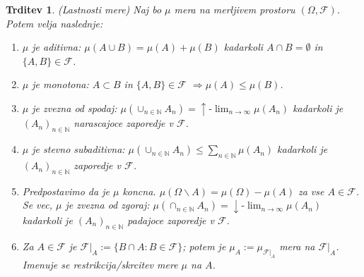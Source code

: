\documentclass[a4paper,12pt]{article}
\theoremstyle{definition} %
\theoremstyle{plain} %
\newtheorem{trditev}[definicija]{Trditev}
\newcommand{\N}{\mathbb{N}}
\newcommand{\F}{\mathcal{F}}
\begin{document}
            \begin{trditev}(Lastnosti mere)
                Naj bo $\mu$ mera na merljivem prostoru $\left( \Omega, \F \right)$. Potem velja naslednje:
                \begin{enumerate}
                    \item $\mu$ je aditivna: $\mu(A \cup B) = \mu(A) + \mu(B)$ kadarkoli $A \cap B = \emptyset$ in $\{A, B\} \in \F$.
                    \item $\mu$ je monotona: $A \subset B$ in $ \{A, B\} \in \F$ $ \Rightarrow \mu(A) \leq \mu(B)$.
                    \item $\mu$ je zvezna od spodaj: $\mu(\cup_{n \in \N}A_n) = \uparrow\text{-}\lim_{n \rightarrow \infty}\mu(A_n)$ kadarkoli je $(A_n)_{n \in \N}$ narascajoce zaporedje v $\F$.
                    \item $\mu$ je stevno subaditivna: $\mu(\cup_{n \in \N}A_n) \leq \sum_{n \in \N}\mu(A_n)$ kadarkoli je $(A_n)_{n \in \N}$ zaporedje v $\F$.
                    \item Predpostavimo da je $\mu$ koncna. $\mu(\Omega\backslash A) = \mu(\Omega) - \mu(A)$ za vse $A \in \F$. Se vec, $\mu$ je zvezna od zgoraj: $\mu(\cap_{n \in \N}A_n) = \downarrow\text{-}\lim_{n \rightarrow \infty}\mu(A_n)$ kadarkoli je $(A_n)_{n \in \N}$ padajoce zaporedje v $\F$.
                    \item Za $A \in \F$ je $\F|_A:=\{B \cap A: B \in \F\}$; potem je $\mu_A:= \mu_{\F|_A}$ mera na $\F|_A$. Imenuje se restrikcija/skrcitev mere $\mu$ na $A$.  
                \end{enumerate}             
            \end{trditev}
\end{document}
